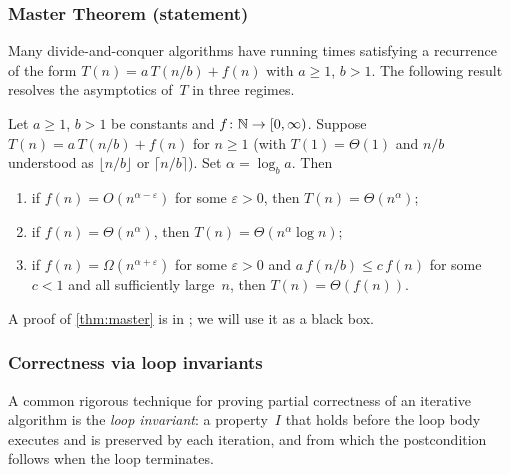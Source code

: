 \subsubsection*{Master Theorem (statement)}

Many divide-and-conquer algorithms have running times satisfying a
recurrence of the form $T(n) = a\, T(n/b) + f(n)$ with $a \geq 1$,
$b > 1$. The following result resolves the asymptotics of~$T$ in
three regimes.

\begin{theorem}
\label{thm:master}
Let $a \geq 1$, $b > 1$ be constants and $f \colon \mathbb{N} \to [0, \infty)$.
Suppose $T(n) = a\, T(n/b) + f(n)$ for $n \geq 1$ (with $T(1) = \Theta(1)$
and $n/b$ understood as $\lfloor n/b \rfloor$ or $\lceil n/b \rceil$).
Set $\alpha = \log_b a$. Then
\begin{enumerate}[label=(\alph*)]
  \item if $f(n) = O(n^{\alpha - \varepsilon})$ for some $\varepsilon > 0$,
        then $T(n) = \Theta(n^\alpha)$;
  \item if $f(n) = \Theta(n^\alpha)$,
        then $T(n) = \Theta(n^\alpha \log n)$;
  \item if $f(n) = \Omega(n^{\alpha + \varepsilon})$ for some $\varepsilon > 0$
        and $a\, f(n/b) \leq c\, f(n)$ for some $c < 1$ and all
        sufficiently large~$n$, then $T(n) = \Theta(f(n))$.
\end{enumerate}
\end{theorem}

A proof of \cref{thm:master} is in \cite[Ch.~4]{CLRS2013}; we
will use it as a black box.

\subsubsection*{Correctness via loop invariants}

A common rigorous technique for proving partial correctness of an
iterative algorithm is the \emph{loop invariant}: a property~$I$ that
holds before the loop body executes and is preserved by each iteration,
and from which the postcondition follows when the loop terminates.

